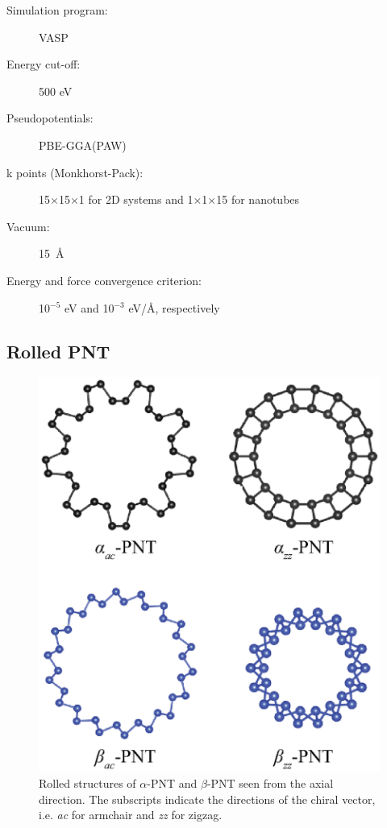 \begin{footnotesize}
\begin{description}
\item[Simulation program:] VASP
\item[Energy cut-off:] 500 eV
\item[Pseudopotentials:] PBE-GGA(PAW)
\item[k points (Monkhorst-Pack):] 15$\times$15$\times$1 for 2D systems and 1$\times$1$\times$15 for nanotubes
\item[Vacuum:] 15~\AA
\item[Energy and force convergence criterion:] 10$^{-5}$ eV and 10$^{-3}$ eV/\AA, respectively
\end{description}
\end{footnotesize}


\subsection{Rolled PNT}
\begin{figure}[htbp]
\centering
\includegraphics[width=0.7\linewidth]{Nanotu_rolled_tubes.eps}%
\caption{Rolled structures of $\alpha$-PNT and $\beta$-PNT seen from the axial direction. The subscripts indicate the directions of the chiral vector, i.e. \textit{ac} for armchair and \textit{zz} for zigzag.\label{natu_rolled}}
\end{figure}

